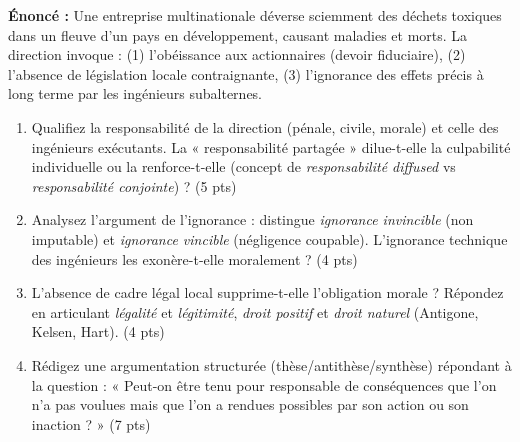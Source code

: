 \documentclass[11pt]{article}
\begin{document}
\begin{exercice}
\textbf{Énoncé :} Une entreprise multinationale déverse sciemment des déchets toxiques dans un fleuve d'un pays en développement, causant maladies et morts. La direction invoque : (1) l'obéissance aux actionnaires (devoir fiduciaire), (2) l'absence de législation locale contraignante, (3) l'ignorance des effets précis à long terme par les ingénieurs subalternes.
\begin{enumerate}
    \item Qualifiez la responsabilité de la direction (pénale, civile, morale) et celle des ingénieurs exécutants. La « responsabilité partagée » dilue-t-elle la culpabilité individuelle ou la renforce-t-elle (concept de \textit{responsabilité diffused} vs \textit{responsabilité conjointe}) ? (5 pts)
    \item Analysez l'argument de l'ignorance : distingue \textit{ignorance invincible} (non imputable) et \textit{ignorance vincible} (négligence coupable). L'ignorance technique des ingénieurs les exonère-t-elle moralement ? (4 pts)
    \item L'absence de cadre légal local supprime-t-elle l'obligation morale ? Répondez en articulant \textit{légalité} et \textit{légitimité}, \textit{droit positif} et \textit{droit naturel} (Antigone, Kelsen, Hart). (4 pts)
    \item Rédigez une argumentation structurée (thèse/antithèse/synthèse) répondant à la question : « Peut-on être tenu pour responsable de conséquences que l'on n'a pas voulues mais que l'on a rendues possibles par son action ou son inaction ? » (7 pts)
\end{enumerate}
\end{exercice}
\end{document}
